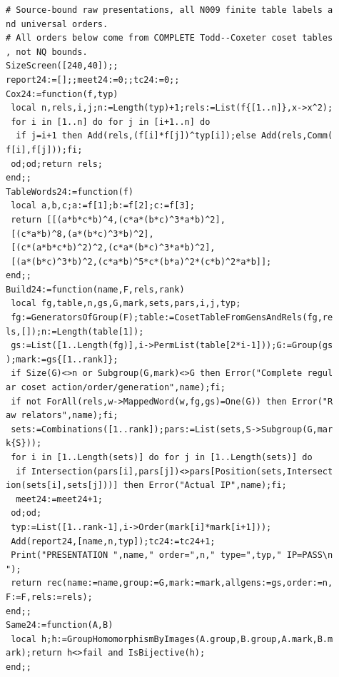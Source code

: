 \documentclass[
  11pt,
  a4paper,
]{article}
\begin{document}
\begin{verbatim}
# Source-bound raw presentations, all N009 finite table labels a
nd universal orders.
# All orders below come from COMPLETE Todd--Coxeter coset tables
, not NQ bounds.
SizeScreen([240,40]);;
report24:=[];;meet24:=0;;tc24:=0;;
Cox24:=function(f,typ)
 local n,rels,i,j;n:=Length(typ)+1;rels:=List(f{[1..n]},x->x^2);
 for i in [1..n] do for j in [i+1..n] do
  if j=i+1 then Add(rels,(f[i]*f[j])^typ[i]);else Add(rels,Comm(
f[i],f[j]));fi;
 od;od;return rels;
end;;
TableWords24:=function(f)
 local a,b,c;a:=f[1];b:=f[2];c:=f[3];
 return [[(a*b*c*b)^4,(c*a*(b*c)^3*a*b)^2],
 [(c*a*b)^8,(a*(b*c)^3*b)^2],
 [(c*(a*b*c*b)^2)^2,(c*a*(b*c)^3*a*b)^2],
 [(a*(b*c)^3*b)^2,(c*a*b)^5*c*(b*a)^2*(c*b)^2*a*b]];
end;;
Build24:=function(name,F,rels,rank)
 local fg,table,n,gs,G,mark,sets,pars,i,j,typ;
 fg:=GeneratorsOfGroup(F);table:=CosetTableFromGensAndRels(fg,re
ls,[]);n:=Length(table[1]);
 gs:=List([1..Length(fg)],i->PermList(table[2*i-1]));G:=Group(gs
);mark:=gs{[1..rank]};
 if Size(G)<>n or Subgroup(G,mark)<>G then Error("Complete regul
ar coset action/order/generation",name);fi;
 if not ForAll(rels,w->MappedWord(w,fg,gs)=One(G)) then Error("R
aw relators",name);fi;
 sets:=Combinations([1..rank]);pars:=List(sets,S->Subgroup(G,mar
k{S}));
 for i in [1..Length(sets)] do for j in [1..Length(sets)] do
  if Intersection(pars[i],pars[j])<>pars[Position(sets,Intersect
ion(sets[i],sets[j]))] then Error("Actual IP",name);fi;
  meet24:=meet24+1;
 od;od;
 typ:=List([1..rank-1],i->Order(mark[i]*mark[i+1]));
 Add(report24,[name,n,typ]);tc24:=tc24+1;
 Print("PRESENTATION ",name," order=",n," type=",typ," IP=PASS\n
");
 return rec(name:=name,group:=G,mark:=mark,allgens:=gs,order:=n,
F:=F,rels:=rels);
end;;
Same24:=function(A,B)
 local h;h:=GroupHomomorphismByImages(A.group,B.group,A.mark,B.m
ark);return h<>fail and IsBijective(h);
end;;


\end{verbatim}
\end{document}
